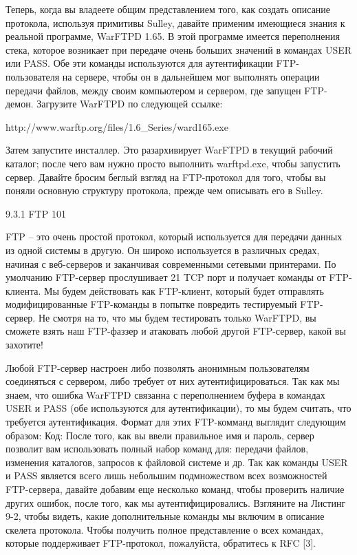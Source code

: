 \documentclass[12pt, a4paper, oneside]{book}
\begin{document}
Теперь, когда вы владеете общим представлением того, как создать описание протокола, используя примитивы Sulley, давайте применим имеющиеся знания к реальной программе, WarFTPD 1.65. В этой программе имеется переполнения стека, которое возникает при передаче очень больших значений в командах USER или PASS. Обе эти команды используются для аутентификации FTP-пользователя на сервере, чтобы он в дальнейшем мог выполнять операции передачи файлов, между своим компьютером и сервером, где запущен FTP-демон. Загрузите WarFTPD по следующей ссылке:

http://www.warftp.org/files/1.6\_Series/ward165.exe

Затем запустите инсталлер. Это разархивирует WarFTPD в текущий рабочий каталог; после чего вам нужно просто выполнить warftpd.exe, чтобы запустить сервер. Давайте бросим беглый взгляд на FTP-протокол для того, чтобы вы поняли основную структуру протокола, прежде чем описывать его в Sulley.

9.3.1 FTP 101

FTP – это очень простой протокол, который используется для передачи данных из одной системы в другую. Он широко используется в различных средах, начиная с веб-серверов и заканчивая современными сетевыми принтерами. По умолчанию FTP-сервер прослушивает 21 TCP порт и получает команды от FTP-клиента. Мы будем действовать как FTP-клиент, который будет отправлять модифицированные FTP-команды в попытке повредить тестируемый FTP-сервер. Не смотря на то, что мы будем тестировать только WarFTPD, вы сможете взять наш FTP-фаззер и атаковать любой другой FTP-сервер, какой вы захотите!

Любой FTP-сервер настроен либо позволять анонимным пользователям соединяться с сервером, либо требует от них аутентифицироваться. Так как мы знаем, что ошибка WarFTPD связанна с переполнением буфера в командах USER и PASS (обе используются для аутентификации), то мы будем считать, что требуется аутентификация. Формат для этих FTP-комманд выглядит следующим образом:
Код:
После того, как вы ввели правильное имя и пароль, сервер позволит вам использовать полный набор команд для: передачи файлов, изменения каталогов, запросов к файловой системе и др. Так как команды USER и PASS является всего лишь небольшим подмножеством всех возможностей FTP-сервера, давайте добавим еще несколько команд, чтобы проверить наличие других ошибок, после того, как мы аутентифицировались. Взгляните на Листинг 9-2, чтобы видеть, какие дополнительные команды мы включим в описание скелета протокола. Чтобы получить полное представление о всех командах, которые поддерживает FTP-протокол, пожалуйста, обратитесь к RFC [3].
\end{document}
